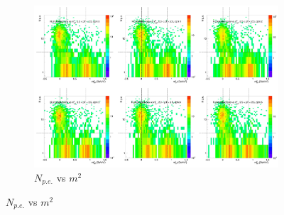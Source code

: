 \begin{figure}[H]
  \centering
    \begin{subfigure}{1\textwidth}
    \includegraphics[width=1\textwidth]{hiptfits/pos/PSaccthreshold_cent0_ich1_accfire0_ptbin9.jpg}
    \caption{$N_{p.e.}$ vs $m^2$}
    \end{subfigure}
\end{figure}
